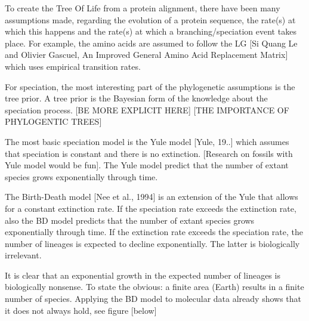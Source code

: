 To create the Tree Of Life from a protein alignment, 
there have been many assumptions 
made, regarding the evolution of a protein sequence, 
the rate(s) at which this happens and the rate(s) at which 
a branching/speciation event takes place. For example,
the amino acids are assumed to follow the LG [Si Quang 
Le and Olivier Gascuel, An Improved General Amino Acid Replacement Matrix] 
which uses empirical transition rates.

%
%

For speciation, the most interesting part of the phylogenetic
assumptions is the tree prior. A tree prior is the Bayesian
form of the knowledge about the speciation process.
[BE MORE EXPLICIT HERE]
[THE IMPORTANCE OF PHYLOGENTIC TREES]

The most basic speciation model
is the Yule model [Yule, 19..] which assumes that speciation
is constant and there is no extinction.
[Research on fossils with Yule model would be fun].
The Yule model predict that the number of extant species
grows exponentially through time.

%

The Birth-Death model [Nee et al., 1994] is an extension of the
Yule that allows for a constant extinction rate. 
If the speciation rate exceeds the extinction rate,
also the BD model predicts that the number of extant species
grows exponentially through time. If the extinction rate exceeds
the speciation rate, the number of lineages is expected to decline
exponentially. The latter is biologically irrelevant.

%

It is clear that an exponential growth in the expected number of lineages
is biologically nonsense. 
To state the obvious: a finite area (Earth) results in a finite number of species. 
Applying the BD model to molecular data already shows that it does not
always hold, see figure [below]

%
%
%
%
%

